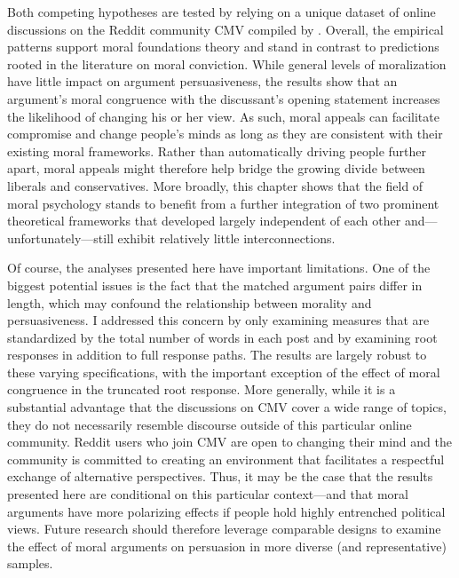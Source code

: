 Both competing hypotheses are tested by relying on a unique dataset of online discussions on the Reddit community CMV compiled by \cite{tan2016winning}. Overall, the empirical patterns support moral foundations theory and stand in contrast to predictions rooted in the literature on moral conviction. While general levels of moralization have little impact on argument persuasiveness, the results show that an argument's moral congruence with the discussant's opening statement increases the likelihood of changing his or her view. As such, moral appeals can facilitate compromise and change people's minds as long as they are consistent with their existing moral frameworks. Rather than automatically driving people further apart, moral appeals might therefore help bridge the growing divide between liberals and conservatives. More broadly, this chapter shows that the field of moral psychology stands to benefit from a further integration of two prominent theoretical frameworks that developed largely independent of each other and---unfortunately---still exhibit relatively little interconnections.

Of course, the analyses presented here have important limitations. One of the biggest potential issues is the fact that the matched argument pairs differ in length, which may confound the relationship between morality and persuasiveness. I addressed this concern by only examining measures that are standardized by the total number of words in each post and by examining root responses in addition to full response paths. The results are largely robust to these varying specifications, with the important exception of the effect of moral congruence in the truncated root response. More generally, while it is a substantial advantage that the discussions on CMV cover a wide range of topics, they do not necessarily resemble discourse outside of this particular online community. Reddit users who join CMV are open to changing their mind and the community is committed to creating an environment that facilitates a respectful exchange of alternative perspectives. Thus, it may be the case that the results presented here are conditional on this particular context---and that moral arguments have more polarizing effects if people hold highly entrenched political views. Future research should therefore leverage comparable designs to examine the effect of moral arguments on persuasion in more diverse (and representative) samples. 

